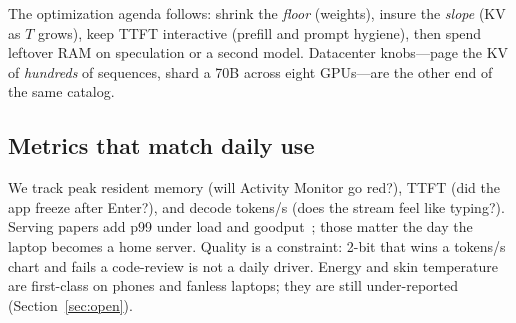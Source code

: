 The optimization agenda follows: shrink the \emph{floor} (weights), insure the \emph{slope} (KV as $T$ grows), keep TTFT interactive (prefill and prompt hygiene), then spend leftover RAM on speculation or a second model. Datacenter knobs---page the KV of \emph{hundreds} of sequences, shard a 70B across eight GPUs---are the other end of the same catalog.

\subsection{Metrics that match daily use}

We track peak resident memory (will Activity Monitor go red?), TTFT (did the app freeze after Enter?), and decode tokens/s (does the stream feel like typing?). Serving papers add p99 under load and goodput~\citep{agrawal2024sarathi}; those matter the day the laptop becomes a home server. Quality is a constraint: 2-bit that wins a tokens/s chart and fails a code-review is not a daily driver. Energy and skin temperature are first-class on phones and fanless laptops; they are still under-reported (Section~\ref{sec:open}).
